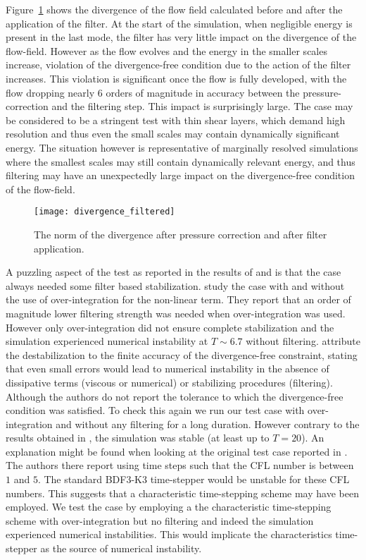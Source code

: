 Figure~\ref{fig:filter_divergence} shows the divergence of the flow field calculated before and after the application of the filter. At the start of the simulation, when negligible energy is present in the last mode, the filter has very little impact on the divergence of the flow-field. However as the flow evolves and the energy in the smaller scales increase, violation of the divergence-free condition due to the action of the filter increases. This violation is significant once the flow is fully developed, with the flow dropping nearly $6$ orders of magnitude in accuracy between the pressure-correction and the filtering step. This impact is surprisingly large. The case may be considered to be a stringent test with thin shear layers, which demand high resolution and thus even the small scales may contain dynamically significant energy. The situation however is representative of marginally resolved simulations where the smallest scales may still contain dynamically relevant energy, and thus filtering may have an unexpectedly large impact on the divergence-free condition of the flow-field.
\begin{figure}[h]
	\centerline{\texttt{[image: divergence\_filtered]}}
	\caption{\small{The norm of the divergence after pressure correction and after filter application.}}
	\label{fig:filter_divergence}
\end{figure}

A puzzling aspect of the test as reported in the results of \cite{fischer01} and \cite{malm13} is that the case always needed some filter based stabilization. \cite{malm13} study the case with and without the use of over-integration for the non-linear term. They report that an order of magnitude lower filtering strength was needed when over-integration was used. However only over-integration did not ensure complete stabilization and the simulation experienced numerical instability at $T\sim6.7$ without filtering. \cite{malm13} attribute the destabilization to the finite accuracy of the divergence-free constraint, stating that even small errors would lead to numerical instability in the absence of dissipative terms (viscous or numerical) or stabilizing procedures (filtering). Although the authors do not report the tolerance to which the divergence-free condition was satisfied. To check this again we run our test case with over-integration and without any filtering for a long duration. However contrary to the results obtained in \cite{malm13}, the simulation was stable (at least up to $T=20$). An explanation might be found when looking at the original test case reported in \cite{fischer01}. The authors there report using time steps such that the CFL number is between $1$ and $5$. The standard BDF3-K3 time-stepper would be unstable for these CFL numbers. This suggests that a characteristic time-stepping scheme may have been employed. We test the case by employing a the characteristic time-stepping scheme with over-integration but no filtering and indeed the simulation experienced numerical instabilities. This would implicate the characteristics time-stepper as the source of numerical instability. 

